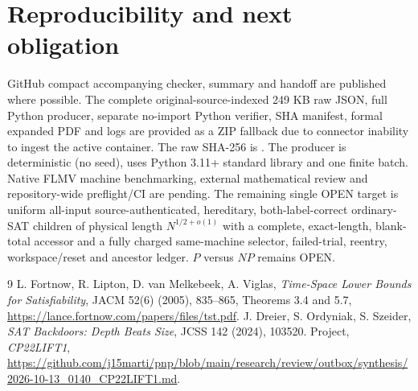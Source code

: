 \documentclass[11pt]{article}
\begin{document}
\section*{Reproducibility and next obligation}
GitHub compact accompanying checker, summary and handoff are published where possible. The complete original-source-indexed 249 KB raw JSON, full Python producer, separate no-import Python verifier, SHA manifest, formal expanded PDF and logs are provided as a ZIP fallback due to connector inability to ingest the active container. The raw SHA-256 is
.
The producer is deterministic (no seed), uses Python 3.11+ standard library and one finite batch. Native FLMV machine benchmarking, external mathematical review and repository-wide preflight/CI are pending.
The remaining single OPEN target is uniform all-input source-authenticated, hereditary, both-label-correct ordinary-SAT children of physical length $N^{1/2+o(1)}$ with a complete, exact-length, blank-total accessor and a fully charged same-machine selector, failed-trial, reentry, workspace/reset and ancestor ledger. $P$ versus $NP$ remains OPEN.
\begin{thebibliography}{9}
 L. Fortnow, R. Lipton, D. van Melkebeek, A. Viglas, \emph{Time-Space Lower Bounds for Satisfiability}, JACM 52(6) (2005), 835--865, Theorems 3.4 and 5.7, \url{https://lance.fortnow.com/papers/files/tst.pdf}.
 J. Dreier, S. Ordyniak, S. Szeider, \emph{SAT Backdoors: Depth Beats Size}, JCSS 142 (2024), 103520.
 Project, \emph{CP22LIFT1}, \url{https://github.com/j15marti/pnp/blob/main/research/review/outbox/synthesis/2026-10-13_0140_CP22LIFT1.md}.
\end{thebibliography}
\end{document}
